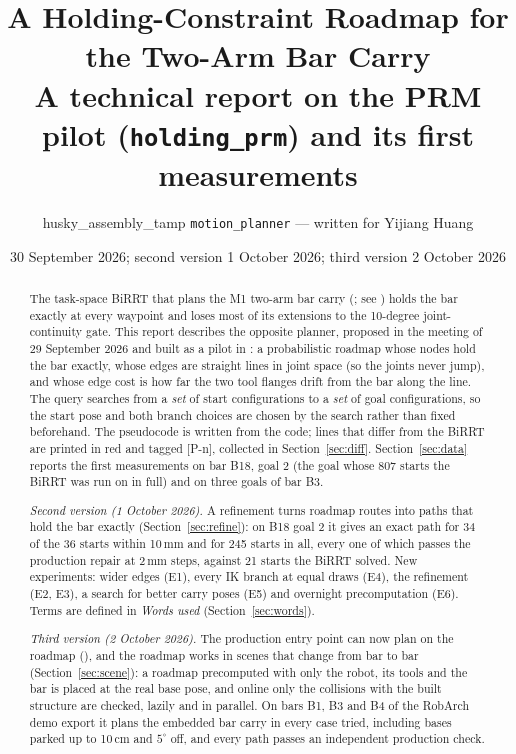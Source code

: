 \documentclass[11pt,a4paper]{article}
\title{A Holding-Constraint Roadmap for the Two-Arm Bar Carry\\
       \large A technical report on the PRM pilot (\texttt{holding\_prm}) and its first measurements}
\author{husky\_assembly\_tamp \texttt{motion\_planner} --- written for Yijiang Huang}
\date{30 September 2026; second version 1 October 2026; third version 2 October 2026}
\newcommand{\code}[1]{\texttt{\detokenize{#1}}}
\newcommand{\D}[1]{\textcolor{diff}{#1}}
\begin{document}
\maketitle

\begin{abstract}
\noindent
The task-space BiRRT that plans the M1 two-arm bar carry
(\code{plan_constrained_dual_arm}; see )
holds the bar exactly at every waypoint and loses most of its extensions to the
10-degree joint-continuity gate. This report describes the opposite planner,
proposed in the meeting of 29 September 2026 and built as a pilot in
: a probabilistic roadmap whose nodes hold the
bar exactly, whose edges are straight lines in joint space (so the joints never
jump), and whose edge cost is how far the two tool flanges drift from the bar
along the line. The query searches from a \emph{set} of start configurations to
a \emph{set} of goal configurations, so the start pose and both branch choices
are chosen by the search rather than fixed beforehand. The pseudocode is written
from the code; lines that differ from the BiRRT are printed in \D{red} and tagged
\D{\textsf{[P-n]}}, collected in Section~\ref{sec:diff}. Section~\ref{sec:data}
reports the first measurements on bar B18, goal 2 (the goal whose 807 starts
the BiRRT was run on in full) and on three goals of bar B3.

\smallskip\noindent
\emph{Second version (1 October 2026).} A refinement turns roadmap routes into
paths that hold the bar exactly (Section~\ref{sec:refine}): on B18 goal 2 it gives
an exact path for 34 of the 36 starts within 10\,mm and for 245 starts in all, every
one of which passes the production repair at 2\,mm steps, against 21 starts the
BiRRT solved. New experiments: wider edges (E1), every IK branch at equal draws
(E4), the refinement (E2, E3), a search for better carry poses (E5) and overnight
precomputation (E6). Terms are defined in \emph{Words used} (Section~\ref{sec:words}).

\smallskip\noindent
\emph{Third version (2 October 2026).} The production entry point can now plan on
the roadmap (\code{backend="prm"}), and the roadmap works in scenes that
change from bar to bar (Section~\ref{sec:scene}): a roadmap precomputed with only the
robot, its tools and the bar is placed at the real base pose, and online only the
collisions with the built structure are checked, lazily and in parallel. On bars B1, B3
and B4 of the RobArch demo export it plans the embedded bar carry in every case tried,
including bases parked up to 10\,cm and $5^\circ$ off, and every path passes an
independent production check.
\end{abstract}
\end{document}

